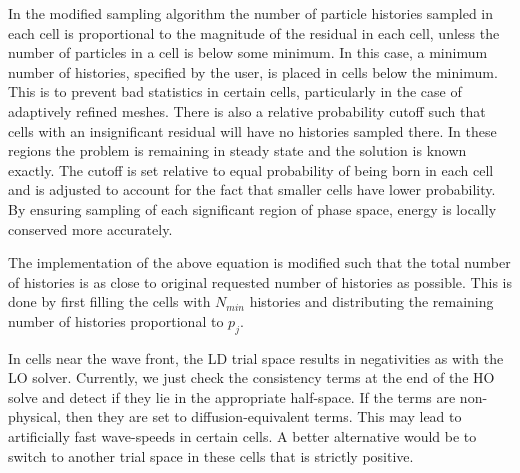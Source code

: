 \documentclass{mc2013}
\begin{document}
In the modified sampling algorithm the number of particle histories sampled in
each cell is proportional to the magnitude of the residual in each cell, unless the
number of particles in a cell is below some minimum. In this case, a minimum number
of histories, specified by the user, is placed in cells below the minimum. This is to
prevent bad statistics in certain cells, particularly in the case of adaptively
refined meshes.  There is
also a relative probability cutoff such that cells with an insignificant
residual will have no histories sampled there. In these regions the problem is
remaining in steady state and the solution is known exactly.  The cutoff is set
relative to equal probability of being born in each cell and is adjusted to account
for the fact that smaller cells have lower probability.  By ensuring sampling of each
significant region of phase space, energy is locally conserved more accurately.   

 The implementation of the above equation is modified such that the total number of histories is as
close to original requested number of histories as possible. This is done by first filling the cells with $N_{min}$ histories and distributing the remaining number of histories proportional to $p_j$.


In cells near the wave front, the LD trial space results in negativities as with the
LO solver.  Currently, we just check the consistency terms at the end of the HO solve
and detect if they lie in the appropriate half-space.  If the terms are non-physical, then
they are set to diffusion-equivalent terms.  This may lead to artificially fast
wave-speeds in certain cells.  A better alternative would be to switch to another
trial space in these cells that is strictly positive.  
\end{document}
